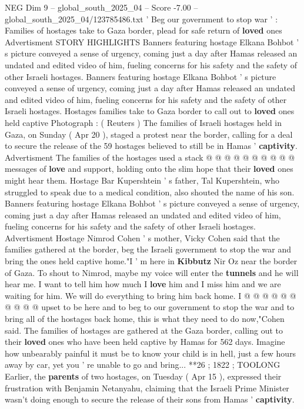 \begin{textsample}{NEG Dim 9 – global\_south\_2025\_04 – Score -7.00 – global\_south\_2025\_04/123785486.txt}  \label{ex:f9_neg_291}
' Beg our government to stop war ' : Families of hostages take to Gaza border, plead for safe return of \textbf{loved} ones Advertisment STORY HIGHLIGHTS Banners featuring hostage Elkana Bohbot ' s picture conveyed a sense of urgency, coming just a day after Hamas released an undated and edited video of him, fueling concerns for his safety and the safety of other Israeli hostages.
Banners featuring hostage Elkana Bohbot ' s picture conveyed a sense of urgency, coming just a day after Hamas released an undated and edited video of him, fueling concerns for his safety and the safety of other Israeli hostages.
Hostages families take to Gaza border to call out to \textbf{loved} ones held captive Photograph : ( Reuters ) The families of Israeli hostages held in Gaza, on Sunday ( Apr 20 ), staged a protest near the border, calling for a deal to secure the release of the 59 hostages believed to still be in Hamas ' \textbf{captivity}.
Advertisment The families of the hostages used a stack @ @ @ @ @ @ @ @ @ @ messages of \textbf{love} and support, holding onto the slim hope that their \textbf{loved} ones might hear them.
Hostage Bar Kupershtein ' s father, Tal Kupershtein, who struggled to speak due to a medical condition, also shouted the name of his son.
Banners featuring hostage Elkana Bohbot ' s picture conveyed a sense of urgency, coming just a day after Hamas released an undated and edited video of him, fueling concerns for his safety and the safety of other Israeli hostages.
Advertisment Hostage Nimrod Cohen ' s mother, Vicky Cohen said that the families gathered at the border, beg the Israeli government to stop the war and bring the ones held captive home."I ' m here in \textbf{Kibbutz} Nir Oz near the border of Gaza.
To shout to Nimrod, maybe my voice will enter the \textbf{tunnels} and he will hear me.
I want to tell him how much I \textbf{love} him and I miss him and we are waiting for him.
We will do everything to bring him back home.
I @ @ @ @ @ @ @ @ @ @ upset to be here and to beg to our government to stop the war and to bring all of the hostages back home, this is what they need to do now,"Cohen said.
The families of hostages are gathered at the Gaza border, calling out to their \textbf{loved} ones who have been held captive by Hamas for 562 days.
Imagine how unbearably painful it must be to know your child is in hell, just a few hours away by car, yet you ' re unable to go and bring... **26 ; 1822 ; TOOLONG Earlier, the \textbf{parents} of two hostages, on Tuesday ( Apr 15 ), expressed their frustration with Benjamin Netanyahu, claiming that the Israeli Prime Minister wasn't doing enough to secure the release of their sons from Hamas ' \textbf{captivity}.

\end{textsample}

